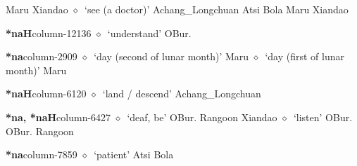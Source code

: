          Maru 
\hspace{1ex}
         Xiandao 
\hspace{1ex}
         $\diamond$~`see (a doctor)'
         Achang\_Longchuan 
\hspace{1ex}
         Atsi 
\hspace{1ex}
         Bola 
\hspace{1ex}
         Maru 
\hspace{1ex}
         Xiandao 
  \item {\footnotesize \textbf{*naH}}{\tiny column-12136}
         $\diamond$~`understand'
         OBur. 
  \item {\footnotesize \textbf{*na}}{\tiny column-2909}
         $\diamond$~`day (second of lunar month)'
         Maru 
\hspace{1ex}
         $\diamond$~`day (first of lunar month)'
         Maru 
  \item {\footnotesize \textbf{*naH}}{\tiny column-6120}
         $\diamond$~`land / descend'
         Achang\_Longchuan 
  \item {\footnotesize \textbf{*na, *naH}}{\tiny column-6427}
         $\diamond$~`deaf, be'
         OBur. 
\hspace{1ex}
         Rangoon 
\hspace{1ex}
         Xiandao 
\hspace{1ex}
         $\diamond$~`listen'
         OBur. 
\hspace{1ex}
         OBur. 
\hspace{1ex}
         Rangoon 
  \item {\footnotesize \textbf{*na}}{\tiny column-7859}
         $\diamond$~`patient'
         Atsi 
\hspace{1ex}
         Bola 
\hspace{1ex}
